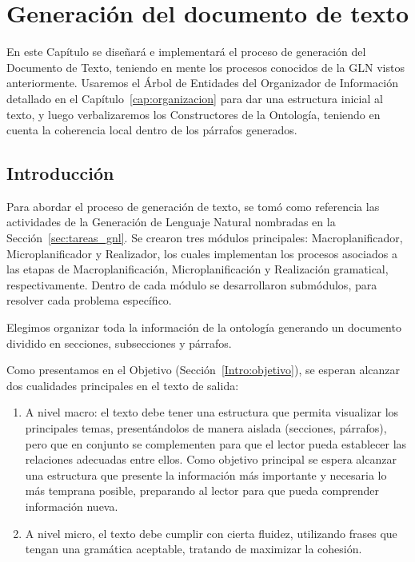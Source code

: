 \chapter{Generación del documento de texto}

En este Capítulo se diseñará e implementará el proceso de generación del Documento de Texto, teniendo en mente los procesos conocidos de la GLN vistos anteriormente. Usaremos el Árbol de Entidades del Organizador de Información detallado en el Capítulo~\ref{cap:organizacion} para dar una estructura inicial al texto, y luego verbalizaremos los Constructores de la Ontología, teniendo en cuenta la coherencia local dentro de los párrafos generados.

\section{Introducción}
Para abordar el proceso de generación de texto, se tomó como referencia las actividades de la Generación de Lenguaje Natural nombradas en la Sección~\ref{sec:tareas_gnl}. Se crearon tres módulos principales: Macroplanificador, Microplanificador y Realizador, los cuales implementan los procesos asociados a las etapas de Macroplanificación, Microplanificación y Realización gramatical, respectivamente. Dentro de cada módulo se desarrollaron submódulos, para resolver cada problema específico. 

Elegimos organizar toda la información de la ontología generando un documento dividido en secciones, subsecciones y párrafos. 

Como presentamos en el Objetivo (Sección~\ref{Intro:objetivo}), se esperan alcanzar dos cualidades principales en el texto de salida:
\begin{enumerate}
    \item A nivel macro: el texto debe tener una estructura que permita visualizar los principales temas, presentándolos de manera aislada (secciones, párrafos), pero que en conjunto se complementen para que el lector pueda establecer las relaciones adecuadas entre ellos. Como objetivo principal se espera alcanzar una estructura que presente la información más importante y necesaria lo más temprana posible, preparando al lector para que pueda comprender información nueva.
    \item A nivel micro, el texto debe cumplir con cierta fluidez, utilizando frases que tengan una gramática aceptable, tratando de maximizar la cohesión.
\end{enumerate}

